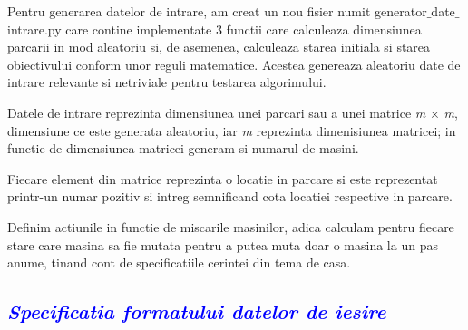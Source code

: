 \documentclass{article}
\begin{document}
\begin{flushleft}
\quad Pentru generarea datelor de intrare, am creat un nou fisier numit generator$\_$date$\_$intrare.py care contine implementate 3 functii care calculeaza dimensiunea parcarii in mod aleatoriu si, de asemenea, calculeaza starea initiala si starea obiectivului conform unor reguli matematice. Acestea genereaza aleatoriu date de intrare relevante si netriviale pentru testarea algorimului.\\  \par
\vspace{2mm}
\quad Datele de intrare reprezinta dimensiunea unei parcari sau a unei matrice \emph m × \emph m, dimensiune ce este generata aleatoriu, iar \emph m reprezinta dimenisiunea matricei; in functie de dimensiunea matricei generam si numarul de masini.\\ \par 
\vspace{2mm}
\quad Fiecare element din matrice reprezinta o locatie in parcare si este reprezentat printr-un numar pozitiv si intreg semnificand cota locatiei respective in parcare.\\ \par
\vspace{2mm}
\quad Definim actiunile in functie de miscarile masinilor, adica calculam pentru fiecare stare care masina sa fie mutata pentru a putea muta doar o masina la un pas anume, tinand cont de specificatiile cerintei din tema de casa.\par
\end{flushleft}
\begin{flushleft}
    \textcolor{blue}{\subsection{\itshape \textcolor{blue}{Specificatia formatului datelor de iesire}}}
    \vspace{5mm}
\end{flushleft}
\end{document}
